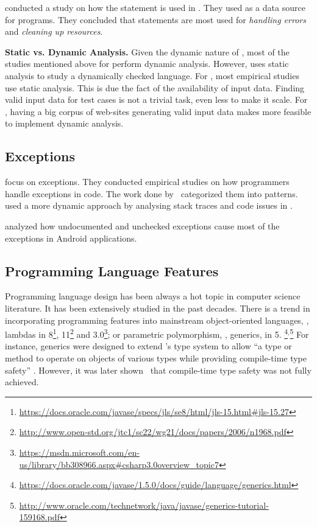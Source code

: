 \cite{nagappanEmpiricalStudyGoto2015} conducted a study on how the
 statement is used in \cc.
They used \github{} as a data source for \cc{} programs.
They concluded that  statements are most used for
\emph{handling errors} and \emph{cleaning up resources}.

\textbf{Static vs. Dynamic Analysis.}
Given the dynamic nature of \javascript, most of the studies mentioned
above for \javascript{} perform dynamic analysis.
However, \cite{callauHowWhyDevelopers2013} uses static analysis to study
a dynamically checked language.
For \java, most empirical studies use static analysis.
This is due the fact of the availability of input data.
Finding valid input data for test cases is not a trivial task,
even less to make it scale.
For \javascript, having a big corpus of web-sites generating valid
input data makes more feasible to implement dynamic analysis.

\subsection*{Exceptions}

\cite{keryExaminingProgrammerPractices2016,asaduzzamanHowDevelopersUse2016} focus on exceptions.
They conducted empirical studies on how programmers handle exceptions in \java{} code.
The work done by~\cite{nakshatriAnalysisExceptionHandling2016} categorized them into patterns.
\cite{coelhoUnveilingExceptionHandling2015} used a more dynamic approach by analysing stack traces and code issues in \github{}.

\cite{kechagiaUndocumentedUncheckedExceptions2014} analyzed how undocumented and
unchecked exceptions cause most of the exceptions in
Android applications.

\subsection*{Programming Language Features}

Programming language design has been always a hot topic in computer science literature.
It has been extensively studied in the past decades.
There is a trend in incorporating programming features into mainstream object-oriented languages, \eg,
lambdas in \java{} 8\footnote{\url{https://docs.oracle.com/javase/specs/jls/se8/html/jls-15.html\#jls-15.27}},
\cpp{}11\footnote{\url{http://www.open-std.org/jtc1/sc22/wg21/docs/papers/2006/n1968.pdf}} and
\csharp{} 3.0\footnote{\url{https://msdn.microsoft.com/en-us/library/bb308966.aspx\#csharp3.0overview\_topic7}};
or parametric polymorphism, \ie{}, generics, in \java{} 5.%
\footnote{\url{https://docs.oracle.com/javase/1.5.0/docs/guide/language/generics.html}}\(^{,}\)\footnote{\url{http://www.oracle.com/technetwork/java/javase/generics-tutorial-159168.pdf}}
For instance, \java{} generics were designed to extend
\java's type system to allow
``a type or method to operate on objects of various types while
providing compile-time type safety''
\citep{Gosling:2013:JLS:2462622}.
However, it was later shown~\citep{aminJavaScalaType2016} that 
compile-time type safety was not fully achieved.

